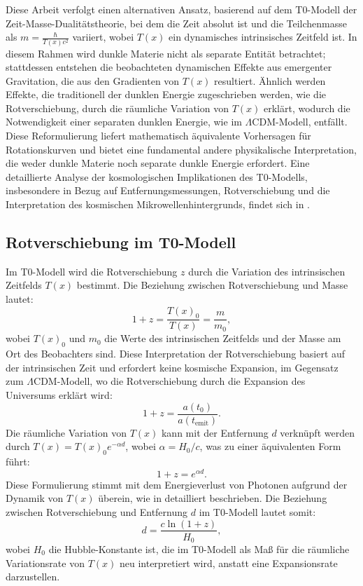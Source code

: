 \documentclass[12pt,a4paper]{article}
\newcommand{\Tfield}{T(x)}
\begin{document}
	Diese Arbeit verfolgt einen alternativen Ansatz, basierend auf dem T0-Modell der Zeit-Masse-Dualitätstheorie, bei dem die Zeit absolut ist und die Teilchenmasse als \( m = \frac{\hbar}{\Tfield c^2} \) variiert, wobei \( \Tfield \) ein dynamisches intrinsisches Zeitfeld ist. In diesem Rahmen wird dunkle Materie nicht als separate Entität betrachtet; stattdessen entstehen die beobachteten dynamischen Effekte aus emergenter Gravitation, die aus den Gradienten von \( \Tfield \) resultiert. Ähnlich werden Effekte, die traditionell der dunklen Energie zugeschrieben werden, wie die Rotverschiebung, durch die räumliche Variation von \( \Tfield \) erklärt, wodurch die Notwendigkeit einer separaten dunklen Energie, wie im \(\Lambda\)CDM-Modell, entfällt. Diese Reformulierung liefert mathematisch äquivalente Vorhersagen für Rotationskurven und bietet eine fundamental andere physikalische Interpretation, die weder dunkle Materie noch separate dunkle Energie erfordert. Eine detaillierte Analyse der kosmologischen Implikationen des T0-Modells, insbesondere in Bezug auf Entfernungsmessungen, Rotverschiebung und die Interpretation des kosmischen Mikrowellenhintergrunds, findet sich in \cite{pascher_messdifferenzen_2025}.
	
	\subsection{Rotverschiebung im T0-Modell}
	Im T0-Modell wird die Rotverschiebung \( z \) durch die Variation des intrinsischen Zeitfelds \( \Tfield \) bestimmt. Die Beziehung zwischen Rotverschiebung und Masse lautet:
	\begin{equation}
		1 + z = \frac{\Tfield_0}{\Tfield} = \frac{m}{m_0},
	\end{equation}
	wobei \( \Tfield_0 \) und \( m_0 \) die Werte des intrinsischen Zeitfelds und der Masse am Ort des Beobachters sind. Diese Interpretation der Rotverschiebung basiert auf der intrinsischen Zeit und erfordert keine kosmische Expansion, im Gegensatz zum \(\Lambda\)CDM-Modell, wo die Rotverschiebung durch die Expansion des Universums erklärt wird:
	\begin{equation}
		1 + z = \frac{a(t_0)}{a(t_{\text{emit}})}.
	\end{equation}
	Die räumliche Variation von \( \Tfield \) kann mit der Entfernung \( d \) verknüpft werden durch \( \Tfield = \Tfield_0 e^{-\alpha d} \), wobei \( \alpha = H_0/c \), was zu einer äquivalenten Form führt:
	\begin{equation}
		1 + z = e^{\alpha d}.
	\end{equation}
	Diese Formulierung stimmt mit dem Energieverlust von Photonen aufgrund der Dynamik von \( \Tfield \) überein, wie in \cite{pascher_messdifferenzen_2025} detailliert beschrieben. Die Beziehung zwischen Rotverschiebung und Entfernung \( d \) im T0-Modell lautet somit:
	\begin{equation}
		d = \frac{c \ln(1 + z)}{H_0},
	\end{equation}
	wobei \( H_0 \) die Hubble-Konstante ist, die im T0-Modell als Maß für die räumliche Variationsrate von \( \Tfield \) neu interpretiert wird, anstatt eine Expansionsrate darzustellen.
	
\end{document}
